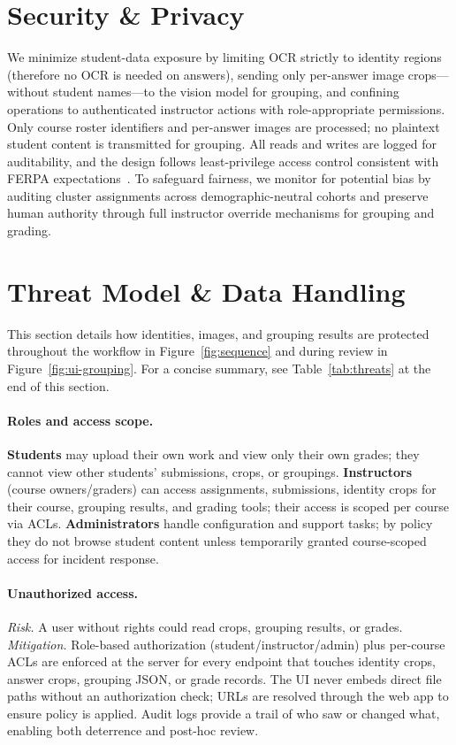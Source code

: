 \documentclass[ms,twoside,print]{nuthesis}
\begin{document}
\section{Security \& Privacy}
We minimize student-data exposure by limiting OCR strictly to identity regions (therefore no OCR is needed on answers), sending only per-answer image crops—without student names—to the vision model for grouping, and confining operations to authenticated instructor actions with role-appropriate permissions. Only course roster identifiers and per-answer images are processed; no plaintext student content is transmitted for grouping. All reads and writes are logged for auditability, and the design follows least-privilege access control consistent with FERPA expectations~\cite{FERPA1974}. To safeguard fairness, we monitor for potential bias by auditing cluster assignments across demographic-neutral cohorts and preserve human authority through full instructor override mechanisms for grouping and grading.

\section{Threat Model \& Data Handling}
This section details how identities, images, and grouping results are protected throughout the workflow in Figure~\ref{fig:sequence} and during review in Figure~\ref{fig:ui-grouping}. For a concise summary, see Table~\ref{tab:threats} at the end of this section.

\paragraph{Roles and access scope.}
\textbf{Students} may upload their own work and view only their own grades; they cannot view other students’ submissions, crops, or groupings. \textbf{Instructors} (course owners/graders) can access assignments, submissions, identity crops for their course, grouping results, and grading tools; their access is scoped per course via ACLs. \textbf{Administrators} handle configuration and support tasks; by policy they do not browse student content unless temporarily granted course-scoped access for incident response.

\paragraph{Unauthorized access.}
\emph{Risk.} A user without rights could read crops, grouping results, or grades. \emph{Mitigation.} Role-based authorization (student/instructor/admin) plus per-course ACLs are enforced at the server for every endpoint that touches identity crops, answer crops, grouping JSON, or grade records. The UI never embeds direct file paths without an authorization check; URLs are resolved through the web app to ensure policy is applied. Audit logs provide a trail of who saw or changed what, enabling both deterrence and post-hoc review.
\end{document}
